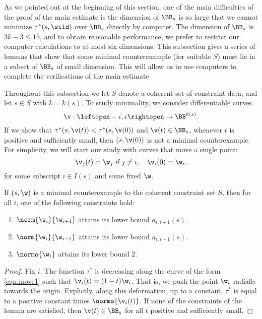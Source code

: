 As we pointed out at the beginning of this section, one of the main
difficulties of the proof of the main estimate is the dimension of
$\BB_s$ is so large that we cannot minimize $\tau^*(s,\wild)$ over $\BB_s$ directly
by computer.  The dimension of $\BB_s$ is $ 3 k- 3 \le 15$, and to
obtain reasonable performance, we prefer to restrict our computer
calculations to at most six dimensions.  This subsection gives a
series of lemmas that show that some minimal counterexample (for
suitable $S$) must lie in a subset of $\BB_s$ of small dimension.
This will allow us to use computers to complete the verifications of
the main estimate.

Throughout this subsection we let $S$ denote a coherent set of constraint
data, and let $s\in S$ with $k=k(s)$.
To study minimality, we consider differentiable curves
\[
\v:\leftopen -\epsilon,\epsilon\rightopen\to \BB^{k(s)}.
\]
If we show that $\tau^*(s,\v(t))<\tau^*(s,\v(0))$ and $\v(t)\in\BB_s$,
whenever $t$ is positive and sufficiently small, then
 $(s,\v(0))$ is not a minimal counterexample.
For simplicity, we will start our study with curves that move a single point:
\begin{equation}\label{eqn:move1}
   \v_j(t)= \w_j\text{ if } j\ne i,\quad \v_i(0) = \w_i,
\end{equation}
for some subscript $i\in I(s)$ and some fixed $\w$.

\begin{lemma}
 If $(s,\w)$ is a minimal counterexample to the coherent constraint
set $S$, then for all $i$, one of the following constraints hold:
\begin{enumerate}
\item $\norm{\w_i}{\w_{i+1}}$ attains its lower bound $a_{i,i+1}(s)$.
\item $\norm{\w_i}{\w_{i-1}}$ attains its lower bound $a_{i,i-1}(s)$.
\item $\normo{\w_i}$ attains its lower bound $2$.
\end{enumerate}
\end{lemma}

\begin{proof} Fix $i$.  The function $\tau^*$ is decreasing along
the curve of the form \eqref{eqn:move1} such that
$\v_i(t)=(1-t) \w_i$.
That is, we push the point $\w_i$ radially towards the origin.
Explictly, along this deformation, up to a constant, $\tau^*$ is equal
to a positive constant times $\normo{\v_i(t)}$.
If none of the constraints of the lemma are satisfied, then
$\v(t)\in \BB_s$ for all $t$ positive and sufficiently
small.
\end{proof}

